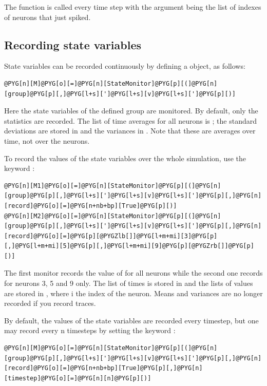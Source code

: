 \documentclass[letterpaper,10pt,english]{manual}
\begin{document}
The function  is called every time step with the argument  being the list of
indexes of neurons that just spiked.


\subsection{Recording state variables}

State variables can be recorded continuously by defining a \hyperlink{brian.StateMonitor}{} object, as follows:

\begin{Verbatim}[commandchars=@\[\]]
@PYG[n][M]@PYG[o][=]@PYG[n][StateMonitor]@PYG[p][(]@PYG[n][group]@PYG[p][,]@PYG[l+s][']@PYG[l+s][v]@PYG[l+s][']@PYG[p][)]
\end{Verbatim}

Here the state variables  of the defined group are monitored. By default, only the statistics
are recorded. The list of time averages for all neurons is ; the standard deviations are stored
in  and the variances in . Note that these are averages over time, not over the neurons.

To record the values of the state variables over the whole simulation, use the keyword :

\begin{Verbatim}[commandchars=@\[\]]
@PYG[n][M1]@PYG[o][=]@PYG[n][StateMonitor]@PYG[p][(]@PYG[n][group]@PYG[p][,]@PYG[l+s][']@PYG[l+s][v]@PYG[l+s][']@PYG[p][,]@PYG[n][record]@PYG[o][=]@PYG[n+nb+bp][True]@PYG[p][)]
@PYG[n][M2]@PYG[o][=]@PYG[n][StateMonitor]@PYG[p][(]@PYG[n][group]@PYG[p][,]@PYG[l+s][']@PYG[l+s][v]@PYG[l+s][']@PYG[p][,]@PYG[n][record]@PYG[o][=]@PYG[p][@PYGZlb[]]@PYG[l+m+mi][3]@PYG[p][,]@PYG[l+m+mi][5]@PYG[p][,]@PYG[l+m+mi][9]@PYG[p][@PYGZrb[]]@PYG[p][)]
\end{Verbatim}

The first monitor records the value of  for all neurons while the second one records  for
neurons 3, 5 and 9 only. The list of times is stored in  and the lists of values are stored in
, where i the index of the neuron. Means and variances are no longer recorded if you
record traces.

By default, the values of the state variables are recorded every timestep, but one may record every n timesteps
by setting the keyword :

\begin{Verbatim}[commandchars=@\[\]]
@PYG[n][M]@PYG[o][=]@PYG[n][StateMonitor]@PYG[p][(]@PYG[n][group]@PYG[p][,]@PYG[l+s][']@PYG[l+s][v]@PYG[l+s][']@PYG[p][,]@PYG[n][record]@PYG[o][=]@PYG[n+nb+bp][True]@PYG[p][,]@PYG[n][timestep]@PYG[o][=]@PYG[n][n]@PYG[p][)]
\end{Verbatim}
\end{document}
